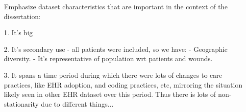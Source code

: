 Emphasize dataset characteristics that are important in the context of
the dissertation: 

1. It's big

2. It's secondary use - all patients were included, so we have:
- Geographic diversity.
- It's representative of population wrt patients and wounds.

3. It spans a time period during which there were lots of changes to
care practices, like EHR adoption, and coding practices, etc,
mirroring the situation likely seen in other EHR dataset over this
period.  Thus there is lots of non-stationarity due to different
things...




